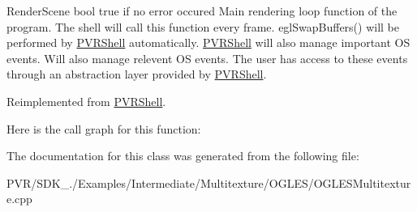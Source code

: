   Render\+Scene  bool true if no error occured  Main rendering loop function of the program. The shell will call this function every frame. egl\+Swap\+Buffers() will be performed by \hyperlink{class_p_v_r_shell}{P\+V\+R\+Shell} automatically. \hyperlink{class_p_v_r_shell}{P\+V\+R\+Shell} will also manage important O\+S events. Will also manage relevent O\+S events. The user has access to these events through an abstraction layer provided by \hyperlink{class_p_v_r_shell}{P\+V\+R\+Shell}. 

Reimplemented from \hyperlink{class_p_v_r_shell_ae0eb5f797cbe993a22b8659f9c332578}{P\+V\+R\+Shell}.



Here is the call graph for this function\+:




The documentation for this class was generated from the following file\+:\begin{DoxyCompactItemize}
\item 
P\+V\+R/\+S\+D\+K\+\_./\+Examples/\+Intermediate/\+Multitexture/\+O\+G\+L\+E\+S/O\+G\+L\+E\+S\+Multitexture.\+cpp\end{DoxyCompactItemize}
